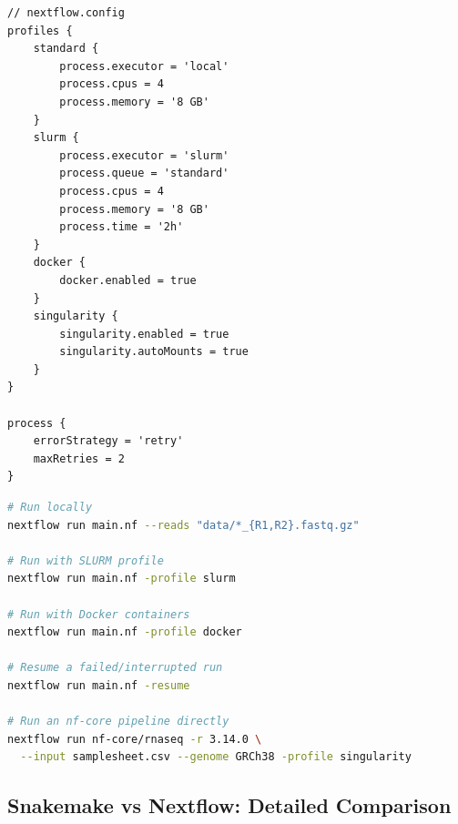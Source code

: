 \begin{lstlisting}[caption={nextflow.config for the QC pipeline.},label=lst:nextflow-config]
// nextflow.config
profiles {
    standard {
        process.executor = 'local'
        process.cpus = 4
        process.memory = '8 GB'
    }
    slurm {
        process.executor = 'slurm'
        process.queue = 'standard'
        process.cpus = 4
        process.memory = '8 GB'
        process.time = '2h'
    }
    docker {
        docker.enabled = true
    }
    singularity {
        singularity.enabled = true
        singularity.autoMounts = true
    }
}

process {
    errorStrategy = 'retry'
    maxRetries = 2
}
\end{lstlisting}

\begin{lstlisting}[language=bash,caption={Running the Nextflow QC pipeline.},label=lst:nextflow-run]
# Run locally
nextflow run main.nf --reads "data/*_{R1,R2}.fastq.gz"

# Run with SLURM profile
nextflow run main.nf -profile slurm

# Run with Docker containers
nextflow run main.nf -profile docker

# Resume a failed/interrupted run
nextflow run main.nf -resume

# Run an nf-core pipeline directly
nextflow run nf-core/rnaseq -r 3.14.0 \
  --input samplesheet.csv --genome GRCh38 -profile singularity
\end{lstlisting}

\subsection{Snakemake vs Nextflow: Detailed Comparison}
\label{subsec:bioinf:smk-vs-nf}


